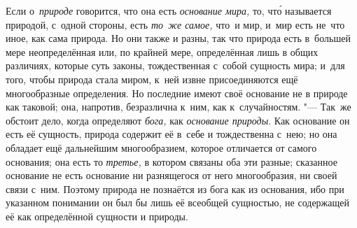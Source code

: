 Если о~{\em природе} говорится, что она есть {\em основание мира,} то, чт\'{о}
называется природой, с~одной стороны, есть {\em то~же самое,} что~и мир, и~мир
есть не~что иное, как сама природа. Но они также и разны, так что природа есть
в~большей мере неопределённая или, по крайней мере, определённая лишь в общих
различиях, которые суть законы, тождественная с~собой сущность мира; и~для
того, чтобы природа стала миром, к~ней извне присоединяются ещё многообразные
определения. Но последние имеют своё основание не в природе как таковой; она,
напротив, безразлична к~ним, как к~случайностям. "--- Так~же обстоит дело,
когда определяют {\em бога,} как {\em основание природы}. Как основание он есть
её сущность, природа содержит её в~себе и тождественна с~нею; но она обладает
ещё дальнейшим многообразием, которое отличается от самого основания; она есть
то {\em третье,} в котором связаны оба эти разные; сказанное основание не есть
основание ни разнящегося от него многообразия, ни своей связи с~ним. Поэтому
природа не познаётся из бога как из основания, ибо при указанном понимании он
был бы лишь её всеобщей сущностью, не содержащей её как определённой
сущности и природы.

